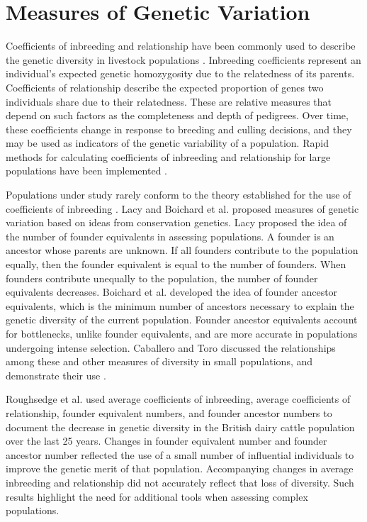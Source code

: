 \section{Measures of Genetic Variation}
\label{sec:methodology-genetic-variation}
Coefficients of inbreeding and relationship \cite{Wright1922} have been commonly used to describe the genetic diversity in livestock populations \cite{ref351}. Inbreeding coefficients represent an individual's expected genetic homozygosity due to the relatedness of its parents. Coefficients of relationship describe the expected proportion of genes two individuals share due to their relatedness. These are relative measures that depend on such factors as the completeness and depth of pedigrees. Over time, these coefficients change in response to breeding and culling decisions, and they may be used as indicators of the genetic variability of a population. Rapid methods for calculating coefficients of inbreeding and relationship for large populations have been implemented \cite{ref337}.

Populations under study rarely conform to the theory established for the use of coefficients of inbreeding \cite{Wright1931}. Lacy \citeyear{ref640} and Boichard et al. \citeyear{ref352} proposed measures of genetic variation based on ideas from conservation genetics. Lacy \citeyear{ref640} proposed the idea of the number of founder equivalents in assessing populations. A founder is an ancestor whose parents are unknown. If all founders contribute to the population equally, then the founder equivalent is equal to the number of founders. When founders contribute unequally to the population, the number of founder equivalents decreases. Boichard et al. \citeyear{ref352} developed the idea of founder ancestor equivalents, which is the minimum number of ancestors necessary to explain the genetic diversity of the current population. Founder ancestor equivalents account for bottlenecks, unlike founder equivalents, and are more accurate in populations undergoing intense selection.  Caballero and Toro \citeyear{ref817} discussed the relationships among these and other measures of diversity in small populations, and demonstrate their use \cite{ref435}.

Roughsedge et al. \citeyear{ref641} used average coefficients of inbreeding, average coefficients of relationship, founder equivalent numbers, and founder ancestor numbers to document the decrease in genetic diversity in the British dairy cattle population over the last 25 years. Changes in founder equivalent number and founder ancestor number reflected the use of a small number of influential individuals to improve the genetic merit of that population. Accompanying changes in average inbreeding and relationship did not accurately reflect that loss of diversity. Such results highlight the need for additional tools when assessing complex populations.
